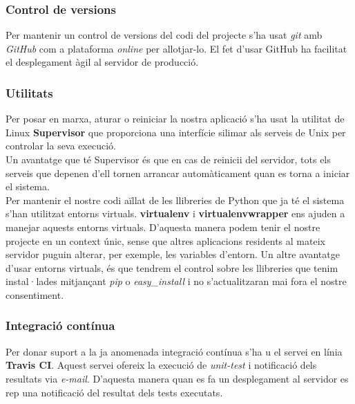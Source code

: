 	\subsubsection{Control de versions}
	Per mantenir un control de versions del codi del projecte s'ha usat \emph{git} \cite{git} amb \emph{GitHub} \cite{github} com a plataforma \emph{online} per allotjar-lo. El fet d'usar GitHub ha facilitat el desplegament àgil al servidor de producció.
	

	\subsubsection{Utilitats}

	Per posar en marxa, aturar o reiniciar la nostra aplicació s'ha usat la utilitat de Linux \textbf{Supervisor} \cite{supervisor} que proporciona una interfície silimar als serveis de Unix per controlar la seva execució. \\
	
	Un avantatge que té Supervisor és que en cas de reinicii del servidor, tots els serveis que depenen d'ell tornen arrancar automàticament quan es torna a iniciar el sistema.\\

	Per mantenir el nostre codi aïllat de les llibreries de Python que ja té el sistema s'han utilitzat entorns virtuals. \textbf{virtualenv} \cite{virtualenv} i \textbf{virtualenvwrapper} \cite{virtualenvwrapper} ens ajuden a manejar aquests entorns virtuals. D'aquesta manera podem tenir el nostre projecte en un context únic, sense que altres aplicacions residents al mateix servidor puguin alterar, per exemple, les variables d'entorn. Un altre avantatge d'usar entorns virtuals, és que tendrem el control sobre les llibreries que tenim instal·lades mitjançant \emph{pip} o \emph{easy\_install} i no s'actualitzaran mai fora el nostre consentiment.\\

	\subsubsection{Integració contínua}

	Per donar suport a la ja anomenada integració contínua s'ha u el servei en línia \textbf{Travis CI}. \cite{travis_ci} Aquest servei ofereix la execució de \emph{unit-test} i notificació dels resultats via \emph{e-mail}. D'aquesta manera quan es fa un desplegament al servidor es rep una notificació del resultat dels tests executats.\\
	
